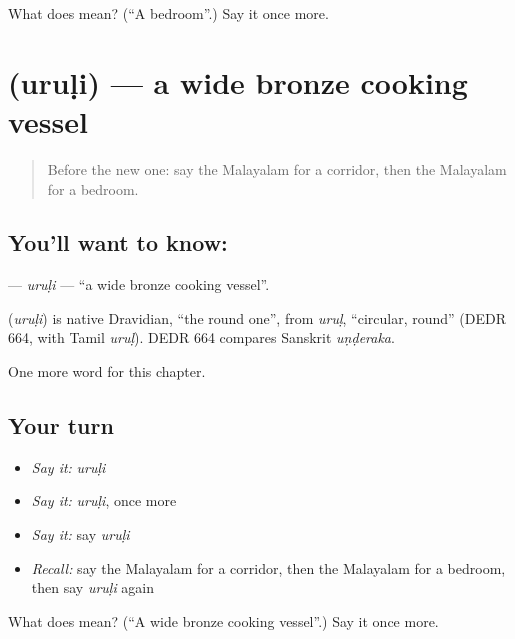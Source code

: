 \begin{tcolorbox}[breakable,colback=teal!4,colframe=teal!35!black,title={Before you move on}]
What does  mean? (\textquotedblleft{}A bedroom\textquotedblright{}.) Say it once more.
\end{tcolorbox}
\section[\texorpdfstring{\ml{ഉരുളി} (uruḷi)}{ഉരുളി (uruḷi)}]{ (uruḷi) — a wide bronze cooking vessel}

\label{lesson:ML-C257-uruli}



\begin{quote}
Before the new one: say the Malayalam for a corridor, then the Malayalam for a bedroom.
\end{quote}

\subsection*{You'll want to know: }
\textbf{} — \emph{uruḷi} — \textquotedblleft{}a wide bronze cooking vessel\textquotedblright{}.

\begin{cousinweb}
\textbf{} (\emph{uruḷi}) is native Dravidian, \textquotedblleft{}the round one\textquotedblright{}, from \emph{uruḷ}, \textquotedblleft{}circular, round\textquotedblright{} (DEDR 664, with Tamil \emph{uruḷ}). DEDR 664 compares Sanskrit \emph{uṇḍeraka}.
\end{cousinweb}

\begin{grammarlens}[title={What you've built}]
One more word for this chapter.
\end{grammarlens}

\subsection*{Your turn}
\begin{itemize}
\raggedright
  \item \emph{Say it:} \emph{uruḷi}
  \item \emph{Say it:} \emph{uruḷi}, once more
  \item \emph{Say it:} say \emph{uruḷi}
  \item \emph{Recall:} say the Malayalam for a corridor, then the Malayalam for a bedroom, then say \emph{uruḷi} again
\end{itemize}

\begin{tcolorbox}[breakable,colback=teal!4,colframe=teal!35!black,title={Before you move on}]
What does  mean? (\textquotedblleft{}A wide bronze cooking vessel\textquotedblright{}.) Say it once more.
\end{tcolorbox}
